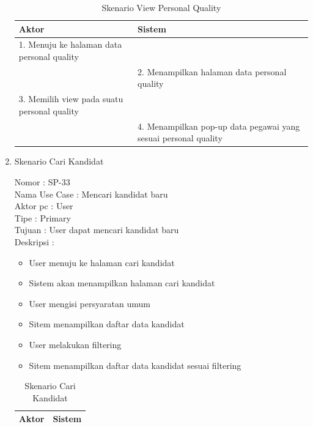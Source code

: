 \begin{enumerate}
\begin{itemize}
\end{itemize}

\begin{table}
	\caption{Skenario View Personal Quality}
	\centering
	\begin{tabular}{ | l | p{52.5mm}|}
		\hline 
		\textbf{Aktor} & \textbf{Sistem} \\
		\hline
		
		1.	Menuju ke halaman data personal quality &  \\
		
		\hline
		
		&  2.	Menampilkan halaman data personal quality \\
		
		\hline
		
		3. Memilih view pada suatu personal quality & \\
		
		\hline
		
		& 4.	Menampilkan pop-up data pegawai yang sesuai personal quality \\
		\hline
		
	\end{tabular}
\end{table}

\item Skenario Cari Kandidat

Nomor \kern 3.6pc : SP-33 \\
Nama Use Case : Mencari kandidat baru \\
Aktor  pc : User \\
Tipe \kern 4.6pc : Primary \\
Tujuan \kern 3.6pc : User dapat mencari kandidat baru \\
Deskripsi \kern 2.5pc : 

\begin{itemize}
	\item User menuju ke halaman cari kandidat
	\item Sistem akan menampilkan halaman cari kandidat
	\item User mengisi persyaratan umum
	\item Sitem menampilkan daftar data kandidat
	\item User melakukan filtering
	\item Sitem menampilkan daftar data kandidat sesuai filtering
	
\end{itemize}

\begin{table}
	\caption{Skenario Cari Kandidat}
	\centering
	\begin{tabular}{ | l | p{67.5mm}|}
		\hline 
		\textbf{Aktor} & \textbf{Sistem} \\
		\hline
		

\end{tabular}
\end{table}
\end{enumerate}
